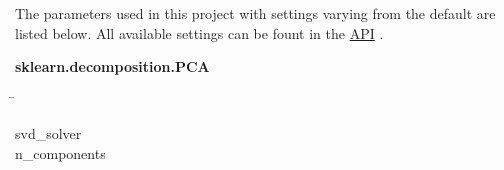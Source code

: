 The parameters used in this project with settings varying from the default are listed below. All available settings can be fount in the
\href{https://scikit-learn.org/stable/modules/generated/sklearn.decomposition.PCA.html}{API} \autocite{pedregosa_scikit-learn_2011}.


\begin{leftbar}
    \textbf{sklearn.decomposition.PCA}
    \begin{nstabbing}
        \qquad\qquad\qquad\qquad\qquad\quad\=\kill

        svd\_solver \\
        n\_components 
    \end{nstabbing}
\end{leftbar}